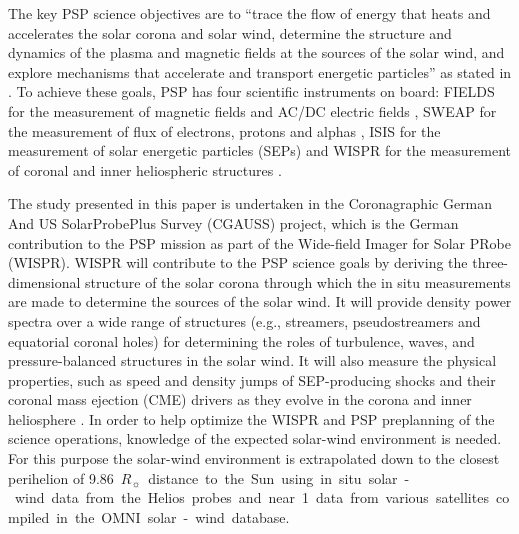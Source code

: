 \documentclass[]{aa}
\newcommand{\Rs}{$R_\sun{}$}
\begin{document}
        The key PSP science objectives are to “trace the flow of energy that heats and accelerates the solar corona and solar wind, determine the structure and dynamics of the plasma and magnetic fields at the sources of the solar wind, and explore mechanisms that accelerate and transport energetic particles” as stated in \citet{Fox2015}. To achieve these goals, PSP has four scientific instruments on board: FIELDS for the measurement of magnetic fields and AC/DC electric fields \citep{Bale2016}, SWEAP for the measurement of flux of electrons, protons and alphas \citep{Kasper2016}, IS\sun{}IS for the measurement of solar energetic particles (SEPs) \citep{McComas2016} and WISPR for the measurement of coronal and inner heliospheric structures \citep{Vourlidas2016}.

        The study presented in this paper is undertaken in the Coronagraphic German And US SolarProbePlus Survey (CGAUSS) project, which is the German contribution to the PSP mission as part of the Wide-field Imager for Solar PRobe (WISPR). WISPR will contribute to the PSP science goals by deriving the three-dimensional structure of the solar corona through which the in situ measurements are made to determine the sources of the solar wind. It will provide density power spectra over a wide range of structures (e.g., streamers, pseudostreamers and equatorial coronal holes) for determining the roles of turbulence, waves, and pressure-balanced structures in the solar wind. It will also measure the physical properties, such as speed and density jumps of SEP-producing shocks and their coronal mass ejection (CME) drivers as they evolve in the corona and inner heliosphere \citep{Vourlidas2016}.
        In order to help optimize the WISPR and PSP preplanning of the science operations, knowledge of the expected solar-wind environment is needed. For this purpose the solar-wind environment is extrapolated down to the closest perihelion of \SI{9.86}{\Rs} distance to the Sun using in situ solar-wind data from the Helios probes and near \SI{1}{\au} data from various satellites compiled in the OMNI solar-wind database.
\end{document}

